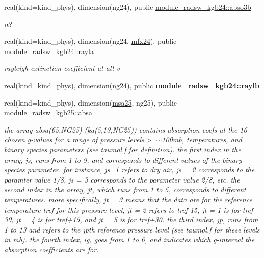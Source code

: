 \begin{DoxyCompactItemize}
\mbox{\label{group__module__radsw__kgbnn_ga6b44aa0637523aa1f78de5b4d16c693b}} 
real(kind=kind\+\_\+phys), dimension(ng24), public \hyperlink{group__module__radsw__kgbnn_ga6b44aa0637523aa1f78de5b4d16c693b}{module\+\_\+radsw\+\_\+kgb24\+::abso3b}
\begin{DoxyCompactList}\small\item\em o3 \end{DoxyCompactList}\item 
\mbox{\label{group__module__radsw__kgbnn_gab24774576414b5d210c34916c3d19404}} 
real(kind=kind\+\_\+phys), dimension(ng24, \hyperlink{group__module__radsw__kgbnn_ga6fcafb0e1605ad49a252ed1e22b00a5b}{mfx24}), public \hyperlink{group__module__radsw__kgbnn_gab24774576414b5d210c34916c3d19404}{module\+\_\+radsw\+\_\+kgb24\+::rayla}
\begin{DoxyCompactList}\small\item\em rayleigh extinction coefficient at all v \end{DoxyCompactList}\item 
\mbox{\label{group__module__radsw__kgbnn_ga927fc4a43727d3e0735448c1cdc60458}} 
real(kind=kind\+\_\+phys), dimension(ng24), public {\bfseries module\+\_\+radsw\+\_\+kgb24\+::raylb}
\item 
\mbox{\label{group__module__radsw__kgbnn_gaf4daf474954d4689219ada6d0662aceb}} 
real(kind=kind\+\_\+phys), dimension(\hyperlink{namespacemodule__radsw__kgb25_afc06df1f3c3a0b2f3189424ed042973e}{msa25}, ng25), public \hyperlink{group__module__radsw__kgbnn_gaf4daf474954d4689219ada6d0662aceb}{module\+\_\+radsw\+\_\+kgb25\+::absa}
\begin{DoxyCompactList}\small\item\em the array absa(65,\+N\+G25) (ka(5,13,\+N\+G25)) contains absorption coefs at the 16 chosen g-\/values for a range of pressure levels$>$ $\sim$100mb, temperatures, and binary species parameters (see taumol.\+f for definition). the first index in the array, js, runs from 1 to 9, and corresponds to different values of the binary species parameter. for instance, js=1 refers to dry air, js = 2 corresponds to the paramter value 1/8, js = 3 corresponds to the parameter value 2/8, etc. the second index in the array, jt, which runs from 1 to 5, corresponds to different temperatures. more specifically, jt = 3 means that the data are for the reference temperature tref for this pressure level, jt = 2 refers to tref-\/15, jt = 1 is for tref-\/30, jt = 4 is for tref+15, and jt = 5 is for tref+30. the third index, jp, runs from 1 to 13 and refers to the jpth reference pressure level (see taumol.\+f for these levels in mb). the fourth index, ig, goes from 1 to 6, and indicates which g-\/interval the absorption coefficients are for. \end{DoxyCompactList}\item 

\end{DoxyCompactItemize}
